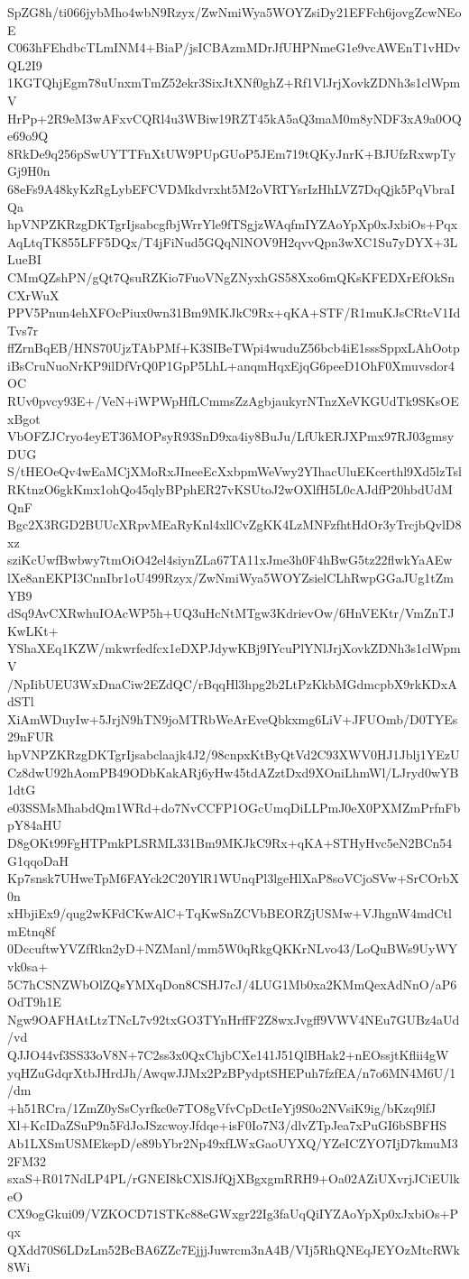 SpZG8h/ti066jybMho4wbN9Rzyx/ZwNmiWya5WOYZsiDy21EFFch6jovgZcwNEoE
C063hFEhdbcTLmINM4+BiaP/jsICBAzmMDrJfUHPNmeG1e9vcAWEnT1vHDvQL2I9
1KGTQhjEgm78uUnxmTmZ52ekr3SixJtXNf0ghZ+Rf1VlJrjXovkZDNh3s1clWpmV
HrPp+2R9eM3wAFxvCQRl4u3WBiw19RZT45kA5aQ3maM0m8yNDF3xA9a0OQe69o9Q
8RkDe9q256pSwUYTTFnXtUW9PUpGUoP5JEm719tQKyJnrK+BJUfzRxwpTyGj9H0n
68eFs9A48kyKzRgLybEFCVDMkdvrxht5M2oVRTYsrIzHhLVZ7DqQjk5PqVbraIQa
hpVNPZKRzgDKTgrIjsabcgfbjWrrYle9fTSgjzWAqfmIYZAoYpXp0xJxbiOs+Pqx
AqLtqTK855LFF5DQx/T4jFiNud5GQqNlNOV9H2qvvQpn3wXC1Su7yDYX+3LLueBI
CMmQZshPN/gQt7QsuRZKio7FuoVNgZNyxhGS58Xxo6mQKsKFEDXrEfOkSnCXrWuX
PPV5Pnun4ehXFOcPiux0wn31Bm9MKJkC9Rx+qKA+STF/R1muKJsCRtcV1IdTvs7r
ffZrnBqEB/HNS70UjzTAbPMf+K3SIBeTWpi4wuduZ56bcb4iE1sssSppxLAhOotp
iBsCruNuoNrKP9ilDfVrQ0P1GpP5LhL+anqmHqxEjqG6peeD1OhF0Xmuvsdor4OC
RUv0pvcy93E+/VeN+iWPWpHfLCmmsZzAgbjaukyrNTnzXeVKGUdTk9SKsOExBgot
VbOFZJCryo4eyET36MOPsyR93SnD9xa4iy8BuJu/LfUkERJXPmx97RJ03gmsyDUG
S/tHEOeQv4wEaMCjXMoRxJIneeEcXxbpmWeVwy2YIhacUluEKcerthl9Xd5lzTsl
RKtnzO6gkKmx1ohQo45qlyBPphER27vKSUtoJ2wOXlfH5L0cAJdfP20hbdUdMQnF
Bgc2X3RGD2BUUcXRpvMEaRyKnl4xllCvZgKK4LzMNFzfhtHdOr3yTrcjbQvlD8xz
sziKcUwfBwbwy7tmOiO42el4siynZLa67TA11xJme3h0F4hBwG5tz22flwkYaAEw
lXe8anEKPI3CnnIbr1oU499Rzyx/ZwNmiWya5WOYZsielCLhRwpGGaJUg1tZmYB9
dSq9AvCXRwhuIOAcWP5h+UQ3uHcNtMTgw3KdrievOw/6HnVEKtr/VmZnTJKwLKt+
YShaXEq1KZW/mkwrfedfcx1eDXPJdywKBj9IYcuPlYNlJrjXovkZDNh3s1clWpmV
/NpIibUEU3WxDnaCiw2EZdQC/rBqqHl3hpg2b2LtPzKkbMGdmcpbX9rkKDxAdSTl
XiAmWDuyIw+5JrjN9hTN9joMTRbWeArEveQbkxmg6LiV+JFUOmb/D0TYEs29nFUR
hpVNPZKRzgDKTgrIjsabclaajk4J2/98cnpxKtByQtVd2C93XWV0HJ1Jblj1YEzU
Cz8dwU92hAomPB49ODbKakARj6yHw45tdAZztDxd9XOniLhmWl/LJryd0wYB1dtG
e03SSMsMhabdQm1WRd+do7NvCCFP1OGcUmqDiLLPmJ0eX0PXMZmPrfnFbpY84aHU
D8gOKt99FgHTPmkPLSRML331Bm9MKJkC9Rx+qKA+STHyHvc5eN2BCn54G1qqoDaH
Kp7snsk7UHweTpM6FAYck2C20YlR1WUnqPl3lgeHlXaP8soVCjoSVw+SrCOrbX0n
xHbjiEx9/qug2wKFdCKwAlC+TqKwSnZCVbBEORZjUSMw+VJhgnW4mdCtlmEtnq8f
0DccuftwYVZfRkn2yD+NZManl/mm5W0qRkgQKKrNLvo43/LoQuBWs9UyWYvk0sa+
5C7hCSNZWbOlZQsYMXqDon8CSHJ7cJ/4LUG1Mb0xa2KMmQexAdNnO/aP6OdT9h1E
Ngw9OAFHAtLtzTNcL7v92txGO3TYnHrffF2Z8wxJvgff9VWV4NEu7GUBz4aUd/vd
QJJO44vf3SS33oV8N+7C2ss3x0QxChjbCXe141J51QlBHak2+nEOssjtKflii4gW
yqHZuGdqrXtbJHrdJh/AwqwJJMx2PzBPydptSHEPuh7fzfEA/n7o6MN4M6U/1/dm
+h51RCra/1ZmZ0ySsCyrfkc0e7TO8gVfvCpDctIeYj9S0o2NVsiK9ig/bKzq9lfJ
Xl+KcIDaZSuP9n5FdJoJSzcwoyJfdqe+isF0Io7N3/dlvZTpJea7xPuGI6bSBFHS
Ab1LXSmUSMEkepD/e89bYbr2Np49xfLWxGaoUYXQ/YZeICZYO7IjD7kmuM32FM32
sxaS+R017NdLP4PL/rGNEI8kCXlSJfQjXBgxgmRRH9+Oa02AZiUXvrjJCiEUlkeO
CX9ogGkui09/VZKOCD71STKc88eGWxgr22Ig3faUqQiIYZAoYpXp0xJxbiOs+Pqx
QXdd70S6LDzLm52BcBA6ZZc7EjjjJuwrcm3nA4B/VIj5RhQNEqJEYOzMtcRWk8Wi
